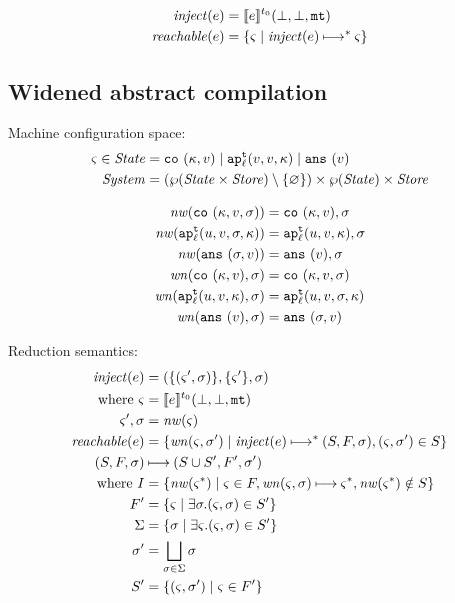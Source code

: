 \documentclass{llncs}
\newcommand{\inject}{\mathit{inject}}
\newcommand{\setof}[1]{\{ #1 \}}
\newcommand{\alt}{\mid}
\begin{document}
\begin{align*}
\inject(\mexp) &= \compile{\mexp}^{\mtcntr}(\bot,\bot,\kmt) \\
\reachable{\mexp} &= \setof{\mstate \mid \inject(\mexp) \machstep^* \mstate}
\end{align*}

\subsection{Widened abstract compilation}

Machine configuration space:
\begin{align*}
\mstate \in \State &= \co{\mkont, \mval} \alt
                     \ap[_\mlab^\mcntr]{\mval,\mval,\mkont} \alt
                     \ans{\mval} \\
\System &= (\wp(\State \times \Store) \setminus \setof{\varnothing}) \times \wp(\State) \times \Store
\end{align*}

\begin{align*}
\nw(\co{\mkont,\mval,\msto}) &= \co{\mkont, \mval}, \msto \\
\nw(\ap[^\mcntr_\mlab]{\mvalx{u},\mval,\msto,\mkont}) &= \ap[^\mcntr_\mlab]{\mvalx{u},\mval,\mkont}, \msto \\
\nw(\ans{\msto,\mval}) &= \ans{\mval}, \msto \\
\wn(\co{\mkont,\mval},\msto) &= \co{\mkont,\mval,\msto} \\
\wn(\ap[^\mcntr_\mlab]{\mvalx{u},\mval,\mkont},\msto) &= \ap[^\mcntr_\mlab]{\mvalx{u},\mval,\msto,\mkont} \\
\wn(\ans{\mval},\msto) &= \ans{\msto,\mval}
\end{align*}

Reduction semantics:
\begin{align*}
\inject(\mexp) &= (\setof{\ttuple{\mstate'}{\msto}},\setof{\mstate'},\msto) \\
 \text{ where } \mstate &= \compile{\mexp}^{\mtcntr}(\bot,\bot,\kmt) \\
                \mstate', \msto &= \nw(\mstate) \\
\reachable{\mexp} &= \setof{\wn(\mstate,\msto') \mid
                             \inject(\mexp) \machstep^* (S,F,\msto),
                             \ttuple{\mstate}{\msto'} \in S} \\
(S,F,\msto) &\machstep (S \cup S', F', \msto') \\
 \text{ where }
  I &= \setof{ \nw(\mstate^*) \mid \mstate \in F, \wn(\mstate,\msto) \machstep \mstate^*, \nw(\mstate^*)\notin S} \\
  F' &= \setof{\mstate \mid \exists \msto. \ttuple{\mstate}{\msto} \in S'} \\
  \Sigma &= \setof{\msto \mid \exists \mstate. \ttuple{\mstate}{\msto} \in S'} \\
  \msto' &= \bigsqcup\limits_{\msto\in\Sigma}{\msto} \\
  S' &= \setof{\ttuple{\mstate}{\msto'} \mid \mstate \in F'}
\end{align*}
\end{document}
